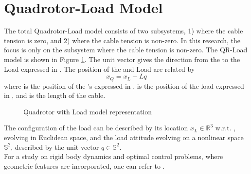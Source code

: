 \section{Quadrotor-Load Model}	\label{sec:mod.QRLmod}
The total Quadrotor-Load model consists of two subsystems, 1) where the cable tension is zero, and 2) where the cable tension is non-zero.
In this research, the focus is only on the subsystem where the cable tension is non-zero.
The QR-Load model is shown in Figure \ref{fig:mod.modelQRL}. The unit vector  gives the direction from the  to the Load expressed in \BF. The position of the  and Load are related by
\begin{equation}\label{eq:mod.xQ2xL}
x_Q=x_L-Lq
\end{equation}
where  is the position of the 's  expressed in \IF,  is the position of the load expressed in \IF, and  is the length of the cable.
\begin{figure}[h!]
	\centering
	\caption{Quadrotor with Load model representation\label{fig:mod.modelQRL}}
\end{figure}	

The configuration of the load can be described by its location $x_L\in \mathbb{R}^3 $ w.r.t. \IF, evolving in Euclidean space, and the load attitude evolving on a nonlinear space $ \mathbb{S}^2 $, described by the unit vector $ q\in \mathbb{S}^2 $. \\
For a study on rigid body dynamics and optimal control problems, where geometric features are incorporated, one can refer to \cite{Lee2008}. 

